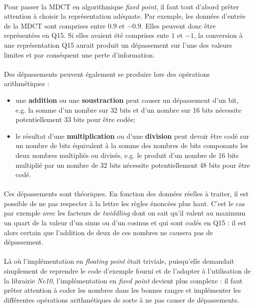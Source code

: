 \documentclass{article}
\begin{document}
    \paragraph{}
    Pour passer la MDCT en algorithmique \emph{fixed point}, il faut tout d'abord prêter attention à choisir la représentation adéquate. Par exemple, les données d'entrée de la MDCT sont comprises entre $0.9$ et $-0.9$. Elles peuvent donc être représentées en Q15. Si elles avaient été comprises ente $1$ et $-1$, la conversion à une représentation Q15 aurait produit un dépassement sur l'une des valeurs limites et par conséquent une perte d'information.

    \paragraph{}
    Des dépassements peuvent également se produire lors des opérations arithmétiques :
    \begin{itemize}
        \item une \textbf{addition} ou une \textbf{soustraction} peut causer un dépassement d'un bit, e.g. la somme d'un nombre sur 32 bits et d'un nombre sur 16 bits nécessite potentiellement 33 bits pour être codée;
        \item le résultat d'une \textbf{multiplication} ou d'une \textbf{division} peut devoir être codé sur un nombre de bits équivalent à la somme des nombres de bits composants les deux nombres multipliés ou divisés, e.g. le produit d'un nombre de 16 bits multiplié par un nombre de 32 bits nécessite potentiellement 48 bits pour être codé.
    \end{itemize}

    \paragraph{}
    Ces dépassements sont théoriques. En fonction des données réelles à traiter, il est possible de ne pas respecter à la lettre les règles énoncées plus haut. C'est le cas par exemple avec les facteurs de \emph{twiddling} dont on sait qu'il valent au maximum un quart de la valeur d'un sinus ou d'un cosinus et qui sont codés en Q15 : il est alors certain que l'addition de deux de ces nombres ne causera pas de dépassement.

    \paragraph{}
    Là où l'implémentation en \emph{floating point} était triviale, puisqu'elle demandait simplement de reprendre le code d'exemple fourni et de l'adapter à l'utilisation de la librairie \emph{Ne10}, l'implémentation en \emph{fixed point} devient plus complexe : il faut prêter attention à coder les nombres dans les bonnes ranges et implémenter les différentes opérations arithmétiques de sorte à ne pas causer de dépassements.
\end{document}
